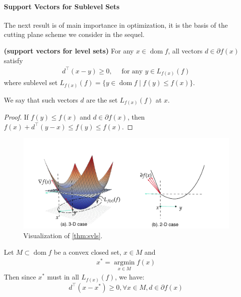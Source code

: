 \documentclass{article}
\newcommand{\bfs}[1]{\textbf{({#1}) }}
\newcommand{\dom}{\operatorname{dom}}
\begin{document}
\paragraph{Support Vectors for Sublevel Sets}
The next result is of main importance in optimization, it is the basis of the cutting plane scheme we consider in the sequel.
\begin{thma}\bfs{support vectors for level sets}\label{thm:svls}
For any $x \in \dom  f$, all vectors $d \in \partial f(x)$ satisfy
\begin{align*}
d^{\top}(x-y) \geq 0, \quad \text { for any } y \in L_{f(x)}(f)
\end{align*}
where sublevel set $L_{f(x)}(f)=\{y \in \dom  f \mid f(y) \leq f(x)\}$. 
\end{thma}
\begin{rema}
We say that such vectors $d$ are  the set $L_{f(x)}(f)$ at $x$.
\end{rema}
\begin{proof}\color{ForestGreen}
If $f(y) \leq f(x)$ and $d \in \partial f(x)$, then $f(x)+d^{\top}(y-x) \leq f(y) \leq f(x)$.
\end{proof}
\begin{figure}[H]
 \centering
    \includegraphics[width=1\textwidth]{Figs/8.pdf}
\caption{Visualization of \cref{thm:svls}.}\label{fig:svls}
\end{figure}
\begin{cora}
 Let $M \subset\dom f$ be a convex closed set, $x \in M$ and
\begin{align*}
x^{*}=\underset{x \in M}{\operatorname{argmin}} f(x)
\end{align*}
Then since $x^*$ must in all $L_{f(x)}(f)$, we have: $$d^{\top}\left(x-x^{*}\right) \geq 0,\forall x\in M,d\in \partial f(x)$$
\end{cora}
\end{document}
